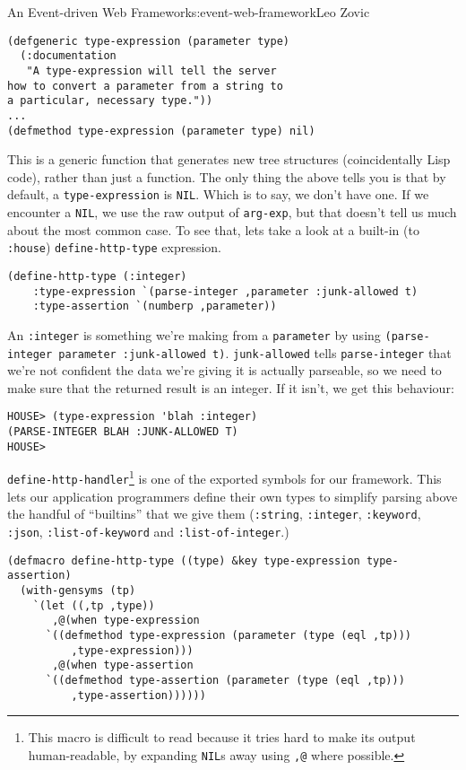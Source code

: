 \begin{aosachapter}{An Event-driven Web Framework}{s:event-web-framework}{Leo Zovic}
\label{type-expression}

\begin{verbatim}
(defgeneric type-expression (parameter type)
  (:documentation
   "A type-expression will tell the server
how to convert a parameter from a string to
a particular, necessary type."))
...
(defmethod type-expression (parameter type) nil)
\end{verbatim}

This is a generic function that generates new tree structures
(coincidentally Lisp code), rather than just a function. The only thing
the above tells you is that by default, a \texttt{type-expression} is
\texttt{NIL}. Which is to say, we don't have one. If we encounter a
\texttt{NIL}, we use the raw output of \texttt{arg-exp}, but that
doesn't tell us much about the most common case. To see that, lets take
a look at a built-in (to \texttt{:house}) \texttt{define-http-type}
expression.

\begin{verbatim}
(define-http-type (:integer)
    :type-expression `(parse-integer ,parameter :junk-allowed t)
    :type-assertion `(numberp ,parameter))
\end{verbatim}

An \texttt{:integer} is something we're making from a \texttt{parameter}
by using \texttt{(parse-integer parameter :junk-allowed t)}.
\texttt{junk-allowed} tells \texttt{parse-integer} that we're not
confident the data we're giving it is actually parseable, so we need to
make sure that the returned result is an integer. If it isn't, we get
this behaviour:

\begin{verbatim}
HOUSE> (type-expression 'blah :integer)
(PARSE-INTEGER BLAH :JUNK-ALLOWED T)
HOUSE>
\end{verbatim}

\texttt{define-http-handler}\footnote{This macro is difficult to read
  because it tries hard to make its output human-readable, by expanding
  \texttt{NIL}s away using \texttt{,@} where possible.} is one of the
exported symbols for our framework. This lets our application
programmers define their own types to simplify parsing above the handful
of ``builtins'' that we give them (\texttt{:string}, \texttt{:integer},
\texttt{:keyword}, \texttt{:json}, \texttt{:list-of-keyword} and
\texttt{:list-of-integer}.)

\begin{verbatim}
(defmacro define-http-type ((type) &key type-expression type-assertion)
  (with-gensyms (tp)
    `(let ((,tp ,type))
       ,@(when type-expression
      `((defmethod type-expression (parameter (type (eql ,tp)))
          ,type-expression)))
       ,@(when type-assertion
      `((defmethod type-assertion (parameter (type (eql ,tp)))
          ,type-assertion))))))
\end{verbatim}


\end{aosachapter}
